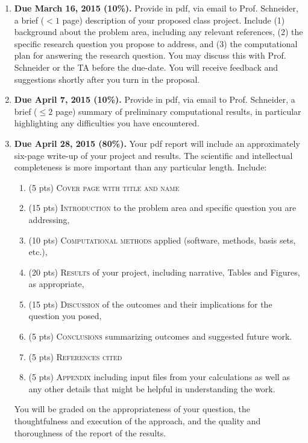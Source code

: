 \documentclass[11pt]{article}
\begin{document}
\begin{enumerate}
\item \textbf{Due March 16, 2015 (10\%).} Provide in pdf, via email to Prof. Schneider, a brief ($< 1$ page) description of your proposed class project. Include (1) background about the problem area, including any relevant references, (2) the specific research question you propose to address, and (3) the computational plan for answering the research question. You may discuss this with Prof. Schneider or the TA before the due-date. You will receive feedback and suggestions shortly after you turn in the proposal.

\item \textbf{Due April 7, 2015 (10\%).} Provide in pdf, via email to Prof. Schneider, a brief ($\leq 2$ page) summary of preliminary computational results, in particular highlighting any difficulties you
have encountered.

\item \textbf{Due April 28, 2015 (80\%).} Your pdf report will include an approximately six-page write-up of your project and results. The scientific and intellectual completeness is more important than any particular length. Include:

  \begin{enumerate}
  \item (5 pts) \textsc{Cover page with title and name}
  \item (15 pts) \textsc{Introduction} to the problem area and specific question you are addressing,
  \item (10 pts) \textsc{Computational methods} applied (software, methods, basis sets, etc.),
  \item (20 pts) \textsc{Results} of your project, including narrative, Tables and Figures, as appropriate,
  \item (15 pts) \textsc{Discussion} of the outcomes and their implications for the question you posed,
  \item (5 pts) \textsc{Conclusions} summarizing outcomes and suggested future work.
  \item (5 pts) \textsc{References cited}
  \item (5 pts) \textsc{Appendix} including input files from your calculations as well as any other details that
might be helpful in understanding the work.
  \end{enumerate}

\noindent You will be graded on the appropriateness of your question, the thoughtfulness and execution of the approach, and the quality and thoroughness of the report of the results.
\end{enumerate}
\end{document}
